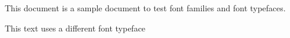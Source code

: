 \documentclass{article}
\begin{document}
	This document is a sample document to 
	test font families and font typefaces.
	
	{\selectfont
		This text uses a different font typeface
	}
\end{document}
